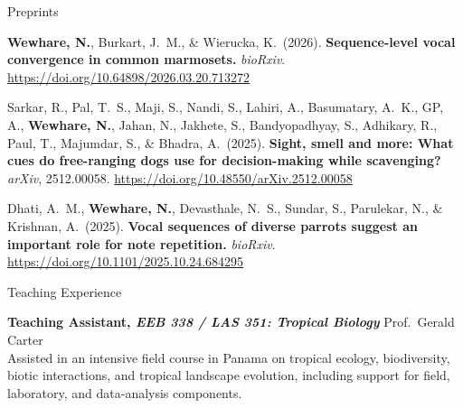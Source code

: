 \documentclass{resume}
\begin{document}
\begin{rSection}{Preprints}

\item {\bf Wewhare, N.}, Burkart, J.\ M., \& Wierucka, K.\ (2026).
{\bf Sequence-level vocal convergence in common marmosets.}
\textit{bioRxiv}. \href{https://doi.org/10.64898/2026.03.20.713272}{https://doi.org/10.64898/2026.03.20.713272}

\item Sarkar, R., Pal, T.\ S., Maji, S., Nandi, S., Lahiri, A., Basumatary, A.\ K., GP, A., {\bf Wewhare, N.}, Jahan, N., Jakhete, S., Bandyopadhyay, S., Adhikary, R., Paul, T., Majumdar, S., \& Bhadra, A.\ (2025).
{\bf Sight, smell and more: What cues do free-ranging dogs use for decision-making while scavenging?}
\textit{arXiv}, 2512.00058. \href{https://doi.org/10.48550/arXiv.2512.00058}{https://doi.org/10.48550/arXiv.2512.00058}

\item Dhati, A.\ M., {\bf Wewhare, N.}, Devasthale, N.\ S., Sundar, S., Parulekar, N., \& Krishnan, A.\ (2025).
{\bf Vocal sequences of diverse parrots suggest an important role for note repetition.}
\textit{bioRxiv}. \href{https://doi.org/10.1101/2025.10.24.684295}{https://doi.org/10.1101/2025.10.24.684295}
\end{rSection}

\newpage
\begin{rSection}{Teaching Experience}
\item {\bf Teaching Assistant, \textit{EEB 338 / LAS 351: Tropical Biology}} \hfill Prof.\ Gerald Carter\\
Assisted in an intensive field course in Panama on tropical ecology, biodiversity, biotic interactions, and tropical landscape evolution, including support for field, laboratory, and data-analysis components.
\end{rSection}
\end{document}
